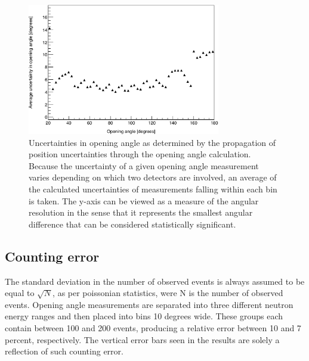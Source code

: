 \begin{figure}[h]
    \centering
    \includegraphics[width = 0.75\textwidth]{Content/Errors/OpeningAngleUncertainty.png}
    \caption{Uncertainties in opening angle as determined by the propagation of position uncertainties through the opening angle calculation.
    Because the uncertainty of a given opening angle measurement varies depending on which two detectors are involved, an average of the calculated uncertainties of measurements falling within each bin is taken.
    The y-axis can be viewed as a measure of the angular resolution in the sense that it represents the smallest angular difference that can be considered statistically significant.
    }
    \label{fig:OpeningAngleRes}
\end{figure}

\subsection{Counting error}
The standard deviation in the number of observed events is always assumed to be equal to $\sqrt{N}$, as per poissonian  statistics, were N is the number of observed events.
Opening angle measurements are separated into three different neutron energy ranges and then placed into bins 10 degrees wide.
These groups each contain between 100 and 200 events, producing a relative error between 10 and 7 percent, respectively.
The vertical error bars seen in the results are solely a reflection of such counting error.


